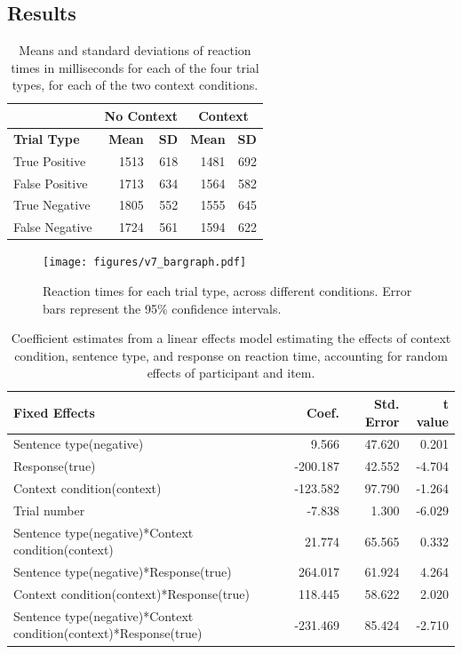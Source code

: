 \documentclass[man]{apa2}
\begin{document}
\subsection{Results}
\begin{table}
\centering
\setlength{\tabcolsep}{10pt}
\begin{tabular}{ l  r  r  r  r } 
\hline
\hline
& \multicolumn{2}{c}{\bf{No Context}} & \multicolumn{2}{c}{\bf{Context}} \\
\hline
  \bf{Trial Type} & \bf{Mean} & \bf{SD} & \bf{Mean} & \bf{SD} \\ \hline \hline                       
True Positive & 1513 & 618 &  1481 & 692\\
\hline
 False Positive & 1713 & 634 &  1564 & 582\\
\hline
 True Negative& 1805 & 552 & 1555 & 645\\
\hline
  False Negative & 1724 & 561 & 1594 & 622 \\
  \hline
\hline
\end{tabular}
\caption{Means and standard deviations of reaction times in milliseconds for each of the four trial types, for each of the two context conditions.}
\end{table}

\begin{figure}
\begin{center} 
\texttt{[image: figures/v7\_bargraph.pdf]}
\caption{\label{fig:addition_subs} Reaction times for each trial type, across different conditions.  Error bars represent the 95\% confidence intervals.}
\end{center} 
\end{figure}

\begin{table}
\centering
\setlength{\tabcolsep}{10pt}
\begin{tabular}{ l  r  r  r  } 
\hline
  \bf{Fixed Effects} & \bf{Coef.} & \bf{Std. Error} & \bf{t value} \\ \hline \hline                       
Sentence type(negative) & 9.566 & 47.620 & 0.201\\
\hline
Response(true) &  -200.187 & 42.552 & -4.704\\
\hline
Context condition(context) & -123.582 & 97.790 & -1.264\\
\hline
Trial number & -7.838 & 1.300 & -6.029\\
\hline
Sentence type(negative)*Context condition(context) & 21.774 & 65.565 & 0.332\\
\hline
Sentence type(negative)*Response(true) & 264.017 & 61.924 & 4.264\\
\hline
Context condition(context)*Response(true) &  118.445 & 58.622 & 2.020\\
\hline
Sentence type(negative)*Context condition(context)*Response(true) & -231.469 & 85.424 & -2.710\\
\hline
\hline
\end{tabular}
\caption{Coefficient estimates from a linear effects model estimating the effects of context condition, sentence type, and response on reaction time, accounting for random effects of participant and item.}
\end{table}
\end{document}
